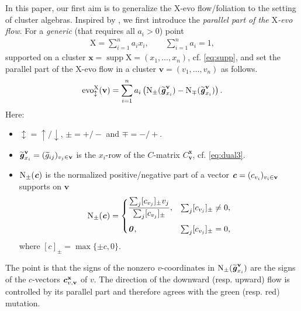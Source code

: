 \documentclass[11pt,reqno]{amsart}
\theoremstyle{plain}
\theoremstyle{definition}
\numberwithin{equation}{section}
\newcommand\<{\langle}
\renewcommand\>{\rangle}
\newcommand{\on}[1]{\operatorname{#1}}
\def\vv{\mathbf{v}}
\def\sink{X}
\newcommand{\flowd}[1]{\on{evo}^{#1}_{\downarrow}}
\newcommand{\flowu}[1]{\on{evo}^{#1}_{\uparrow}}
\newcommand{\flowdu}[1]{\on{evo}_{\updownarrow}^{#1}}
\newcommand{\ccpt}[1]{\mathrm{#1}}%
\def\xevo{\ccpt{X}}%
\newcommand{\bfit}[1]{\textbf{\textit{#1}}}
\def\xx{\mathbf{x}}%
\def\cvec{\bfit{c}}
\def\gvec{\bfit{g}}
\def\supp{\on{supp}}
\def\normal{\on{N}}
\def\tgvec{\widetilde{\gvec}}
\begin{document}
In this paper, our first aim is to generalize the $\xevo$-evo flow/foliation to the setting of cluster algebras. 
Inspired by \cite[Thm.~5.10]{QT}, we first introduce the \emph{parallel part of the $\xevo$-evo flow}. For a \emph{generic} (that requires all $a_i>0$) point %
\begin{gather}\label{eq:intro-generic}
    \xevo=\sum_{i=1}^n a_i x_i,\qquad \sum_{i=1}^n a_i=1,
\end{gather}
supported on a cluster $\xx=\supp\xevo=(x_1,\ldots,x_n)$, cf. \eqref{eq:supp}, and set the parallel part of the $\xevo$-evo flow in a cluster $\vv=(v_1,\ldots,v_n)$ as follows.
\begin{equation}\label{eq:intro-parallel}
\begin{aligned}
\flowdu{\xevo}(\vv)
 =\sum_{i=1}^n a_i\left(
   \normal_\pm(\tgvec_{x_i}^{\vv})
  -\normal_\mp(\tgvec_{x_i}^{\vv})\right).
\end{aligned}
\end{equation}
Here:
\begin{itemize}
    \item $\updownarrow=\uparrow/\downarrow$, $\pm=+/-$ and $\mp=-/+$.
    \item
    $\tgvec_{x_i}^{\vv}=(\widetilde{g}_{ij})_{v_j\in\vv}$ is the $x_i$-row of the $C$-matrix $C^\xx_\vv$, cf. \eqref{eq:dual3}.
    \item 
    $\normal_\pm(\cvec)$ is the normalized positive/negative part of a vector $\cvec=(c_{v_i})_{v_i\in\vv}$ supports on $\vv$
    \begin{equation}\label{eq:intro-normal}
            \normal_\pm(\cvec)=
            \begin{cases}
                \displaystyle
                \frac{\sum_j[ c_{v_j} ]_\pm v_j}
                     {\sum_j[ c_{v_j} ]_\pm},
                &\sum_j[ c_{v_j} ]_\pm\ne0,\\[1.2em]
                \bfit{0},
                &\sum_j[ c_{v_j} ]_\pm=0,
            \end{cases}
    \end{equation}
    where $[c]_\pm=\max\{\pm c,0\}$.
\end{itemize}
The point is that 
the signs of the nonzero $v$-coordinates in $\normal_\pm(\tgvec^\vv_{x_i})$ are the signs of the $c$-vectors $\cvec^{\xx}_{v,\vv}$ of $v$.
The direction of the downward (resp. upward) flow is controlled by its parallel part and therefore agrees with the green (resp. red) mutation.
\end{document}
